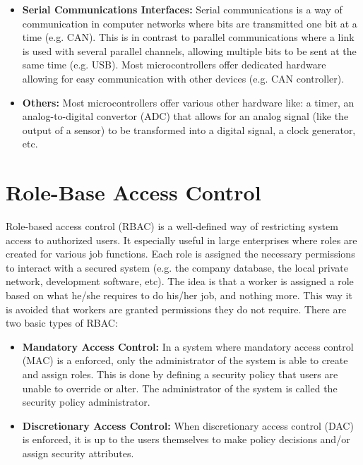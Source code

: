 \begin{itemize}
	\item \textbf{Serial Communications Interfaces:} Serial communications is a way of communication in computer networks where bits are transmitted one bit at a time (e.g. CAN). This is in contrast to parallel communications where a link is used with several parallel channels, allowing multiple bits to be sent at the same time (e.g. USB). Most microcontrollers offer dedicated hardware allowing for easy communication with other devices (e.g. CAN controller).
	
	\item \textbf{Others:} Most microcontrollers offer various other hardware like: a timer, an analog-to-digital convertor (ADC) that allows for an analog signal (like the output of a sensor) to be transformed into a digital signal, a clock generator, etc.
\end{itemize}

\section{Role-Base Access Control}
\label{sec:RBAC}

Role-based access control (RBAC) is a well-defined way of restricting system access to authorized users. It especially useful in large enterprises where roles are created for various job functions. Each role is assigned the necessary permissions to interact with a secured system (e.g. the company database, the local private network, development software, etc). The idea is that a worker is assigned a role based on what he/she requires to do his/her job, and nothing more. This way it is avoided that workers are granted permissions they do not require. There are two basic types of RBAC\cite{wiki:RBAC}:

\begin{itemize}
	\item \textbf{Mandatory Access Control:} In a system where mandatory access control (MAC) is a enforced, only the administrator of the system is able to create and assign roles. This is done by defining a security policy that users are unable to override or alter. The administrator of the system is called the security policy administrator.
	
	\item \textbf{Discretionary Access Control:} When discretionary access control (DAC) is enforced, it is up to the users themselves to make policy decisions and/or assign security attributes.
\end{itemize}

